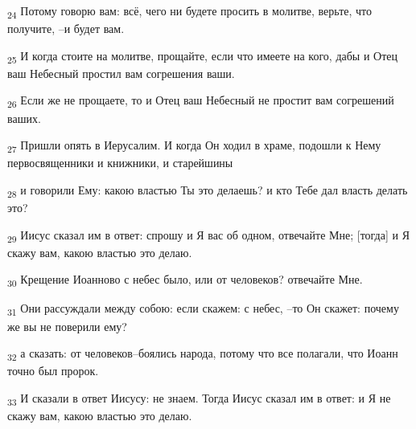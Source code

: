 \begin{tcolorbox}
\textsubscript{24} Потому говорю вам: всё, чего ни будете просить в молитве, верьте, что получите, --и будет вам.
\end{tcolorbox}
\begin{tcolorbox}
\textsubscript{25} И когда стоите на молитве, прощайте, если что имеете на кого, дабы и Отец ваш Небесный простил вам согрешения ваши.
\end{tcolorbox}
\begin{tcolorbox}
\textsubscript{26} Если же не прощаете, то и Отец ваш Небесный не простит вам согрешений ваших.
\end{tcolorbox}
\begin{tcolorbox}
\textsubscript{27} Пришли опять в Иерусалим. И когда Он ходил в храме, подошли к Нему первосвященники и книжники, и старейшины
\end{tcolorbox}
\begin{tcolorbox}
\textsubscript{28} и говорили Ему: какою властью Ты это делаешь? и кто Тебе дал власть делать это?
\end{tcolorbox}
\begin{tcolorbox}
\textsubscript{29} Иисус сказал им в ответ: спрошу и Я вас об одном, отвечайте Мне; [тогда] и Я скажу вам, какою властью это делаю.
\end{tcolorbox}
\begin{tcolorbox}
\textsubscript{30} Крещение Иоанново с небес было, или от человеков? отвечайте Мне.
\end{tcolorbox}
\begin{tcolorbox}
\textsubscript{31} Они рассуждали между собою: если скажем: с небес, --то Он скажет: почему же вы не поверили ему?
\end{tcolorbox}
\begin{tcolorbox}
\textsubscript{32} а сказать: от человеков--боялись народа, потому что все полагали, что Иоанн точно был пророк.
\end{tcolorbox}
\begin{tcolorbox}
\textsubscript{33} И сказали в ответ Иисусу: не знаем. Тогда Иисус сказал им в ответ: и Я не скажу вам, какою властью это делаю.
\end{tcolorbox}

